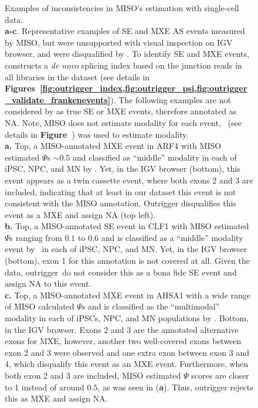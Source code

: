 \clearpage
\thispagestyle{facingcaption}
\begin{figure}[h]
\captionsetup{labelformat=prev-page}
  \caption[Examples of inconsistencies in MISO's estimation with single-cell data.]{Examples of inconsistencies in MISO's estimation with single-cell data.\\
\textbf{a-c}. Representative examples of SE and MXE AS events measured by MISO, but were unsupported with visual inspection on IGV browser, and were disqualified by \outrigger. To identify SE and MXE events, \outrigger\, constructs a \emph{de novo} splicing index based on the junction reads in all libraries in the dataset (see details in \textbf{Figures~\cref{fig:outrigger_index,fig:outrigger_psi,fig:outrigger_validate_frankenevents}}). The following examples are not considered by \outrigger as true SE or MXE events, therefore annotated as NA. Note, MISO does not estimate modality for each event, \anchor\, (see details in \textbf{Figure~}) was used to estimate modality.\\
\textbf{a.} Top, a MISO-annotated MXE event in ARF4 with MISO estimated $\Psi$s $\sim0.5$ and classified as ``middle'' modality in each of iPSC, NPC, and MN by \anchor. Yet, in the IGV browser (bottom), this event appears as a twin cassette event, where both exons 2 and 3 are included, indicating that at least in our dataset this event is not consistent with the MISO annotation. Outrigger disqualifies this event as a MXE and assign NA (top left).\\
\textbf{b.} Top, a MISO-annotated SE event in CLF1 with MISO estimated $\Psi$s ranging from $0.1$ to $0.6$ and is classified as a ``middle'' modality event by \anchor\, in each of iPSC, NPC, and MN.  Yet, in the IGV browser (bottom), exon 1 for this annotation is not covered at all. Given the data, outrigger\ do not consider this as a bona fide SE event and assign NA to this event.\\
\textbf{c.} Top, a MISO-annotated MXE event in AHSA1 with a wide range of MISO calculated $\Psi$s and is classified as the ``multimodal'' modality in each of iPSCs, NPC, and MN populations by \anchor. Bottom, in the IGV browser. Exons 2 and 3 are the annotated alternative exons for MXE, however, another two well-covered exons between exon 2 and 3 were observed and one extra exon between exon 3 and 4, which disqualify this event as an MXE event. Furthermore, when both exon 2 and 3 are included, MISO estimated $\Psi$ scores are closer to 1 instead of around $0.5$, as was seen in (\textbf{a}). Thus, outrigger rejects this as MXE and assign NA.\\
}
\end{figure}
